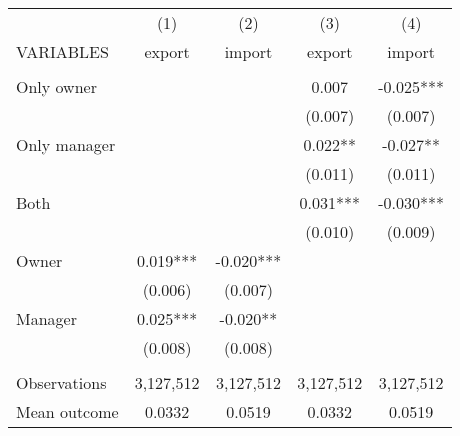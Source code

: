 \begin{tabular}{lcccc} \hline
 & (1) & (2) & (3) & (4) \\
VARIABLES & export & import & export & import \\ \hline
 &  &  &  &  \\
Only owner &  &  & 0.007 & -0.025*** \\
 &  &  & (0.007) & (0.007) \\
Only manager &  &  & 0.022** & -0.027** \\
 &  &  & (0.011) & (0.011) \\
Both &  &  & 0.031*** & -0.030*** \\
 &  &  & (0.010) & (0.009) \\
Owner & 0.019*** & -0.020*** &  &  \\
 & (0.006) & (0.007) &  &  \\
Manager & 0.025*** & -0.020** &  &  \\
 & (0.008) & (0.008) &  &  \\
 &  &  &  &  \\
Observations & 3,127,512 & 3,127,512 & 3,127,512 & 3,127,512 \\
 Mean outcome & 0.0332 & 0.0519 & 0.0332 & 0.0519 \\ \hline
\end{tabular}
